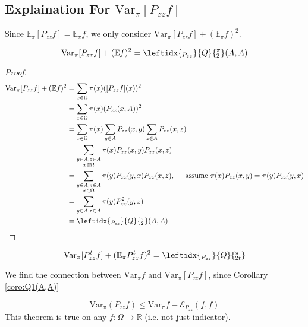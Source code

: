 \subsection{Explaination For $\mathrm{Var}_\pi [P_{zz}f]$}
Since $\mathbb{E}_\pi [P_{zz}f] = \mathbb{E}_\pi f$, we only consider $\mathrm{Var}_\pi [P_{zz}f] + (\mathbb{E}_\pi f)^2$.
\begin{lemma}
  \[\mathrm{Var}_\pi [P_{zz}f] + (\mathbb{E} f)^2 = \leftidx{_{P_{zz}}}{Q}{_2^\pi}(A, A)\]
\end{lemma}
\begin{proof}
  \begin{align*}
    \mathrm{Var}_\pi [P_{zz}f] + (\mathbb{E} f)^2 &= \sum_{x\in\Omega} \pi(x)([P_{zz}f](x))^2 \\
    &= \sum_{x\in\Omega} \pi(x)(P_{zz}(x, A))^2 \\
    &= \sum_{x\in\Omega} \pi(x)\sum_{y\in A} P_{zz}(x, y) \sum_{z\in A} P_{zz}(x, z)\\
    &= \sum_{\substack{y\in A, z\in A\\x\in\Omega}} \pi(x)P_{zz}(x,y)P_{zz}(x,z) \\
    &= \sum_{\substack{y\in A, z\in A\\x\in\Omega}} \pi(y)P_{zz}(y,x)P_{zz}(x,z), \hspace{0.5cm} \mbox{assume $\pi(x)P_{zz}(x, y) = \pi(y)P_{zz}(y,x)$} \\
    &= \sum_{y\in A, z\in A} \pi(y)P_{zz}^2(y,z) \\
    &= \leftidx{_{P_{zz}}}{Q}{_2^\pi}(A, A)
  \end{align*}
\end{proof}
\begin{corollary}
  \[\mathrm{Var}_\pi [P_{zz}^tf] + (\mathbb{E}_\pi P_{zz}^tf)^2 = \leftidx{_{P_{zz}}}{Q}{_{2t}^\pi}\]
\end{corollary}
We find the connection between $\mathrm{Var}_\pi f$ and $\mathrm{Var}_\pi [P_{zz}f]$, since Corollary \ref{coro:Q1(A,A)}
\begin{theorem}
  \[\mathrm{Var}_\pi (P_{zz}f) \leq \mathrm{Var}_\pi f - \mathcal{E}_{P_{zz}} (f, f)\]
  \tcblower
  This theorem is true on any $f:\Omega\to\mathbb{R}$ (i.e. not just indicator).
\end{theorem}

